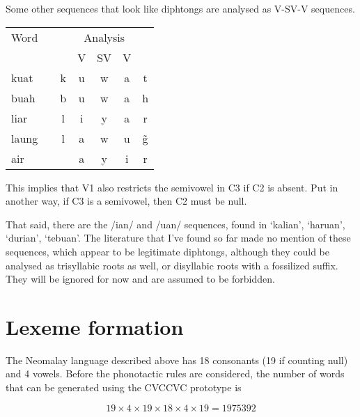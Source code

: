 \documentclass{article}
\begin{document}
Some other sequences that look like diphtongs are analysed as V-SV-V sequences.

\begin{center}
	\begin{tabular}{l c c c c c c}
		\toprule
		Word  & \hspace{2em} & \multicolumn{5}{c}{Analysis} \\
		      &              &   & V & SV & V &             \\ \midrule
		kuat  &              & k & u & w  & a & t           \\
		buah  &              & b & u & w  & a & h           \\
		liar  &              & l & i & y  & a & r           \\
		laung &              & l & a & w  & u & \~g         \\
		air   &              &   & a & y  & i & r           \\ \bottomrule
	\end{tabular}
\end{center}

This implies that V1 also restricts the semivowel in C3 if C2 is absent. Put in another way, if C3 is a semivowel, then C2 must be null. %

That said, there are the /ian/ and /uan/ sequences, found in `kalian', `haruan', `durian', `tebuan'. The literature that I've found so far made no mention of these sequences, which appear to be legitimate diphtongs, although they could be analysed as trisyllabic roots as well, or disyllabic roots with a fossilized suffix. They will be ignored for now and are assumed to be forbidden.


%
%
%
%

\section{Lexeme formation}

The Neomalay language described above has 18 consonants (19 if counting null) and 4 vowels. Before the phonotactic rules are considered, the number of words that can be generated using the CVCCVC prototype is

\[ 19 \times 4 \times 19 \times 18 \times 4 \times 19 = \num{1975392} \]
\end{document}
